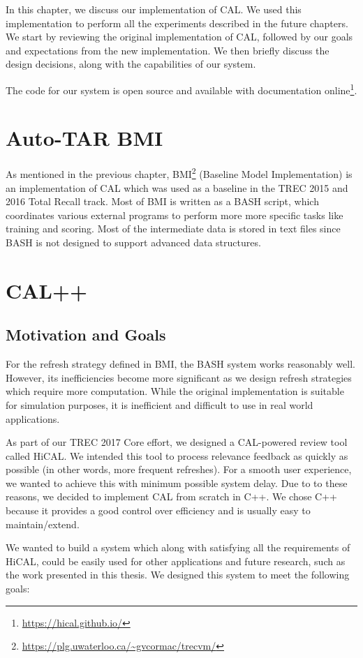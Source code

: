 In this chapter, we discuss our implementation of CAL. We used this
implementation to perform all the experiments described in the future chapters.
We start by reviewing the original implementation of CAL, followed by our goals
and expectations from the new implementation. We then briefly discuss the
design decisions, along with the capabilities of our system.

The code for our system is open source and available with documentation
online\footnote{\url{https://hical.github.io/}}.

\section{Auto-TAR BMI}
As mentioned in the previous chapter,
BMI\footnote{\url{https://plg.uwaterloo.ca/~gvcormac/trecvm/}} (Baseline Model
Implementation) is an implementation of CAL which was used as a baseline in the
TREC 2015 and 2016 Total Recall track. Most of BMI is written as
a BASH script, which coordinates various external programs to perform more
more specific tasks like training and scoring. Most of the intermediate data is
stored in text files since BASH is not designed to support advanced data
structures.

\section{CAL++}

\subsection{Motivation and Goals}
For the refresh strategy defined in BMI, the BASH system works reasonably well.
However, its inefficiencies become more significant as we design refresh
strategies which require more computation. While the original
implementation is suitable for simulation purposes, it is inefficient and
difficult to use in real world applications.

As part of our TREC 2017 Core effort, we designed a CAL-powered review tool
called HiCAL. We intended this tool to process relevance feedback as quickly as
possible (in other words, more frequent refreshes). For a smooth user
experience, we wanted to achieve this with minimum possible system delay. Due to
to these reasons, we decided to implement CAL from scratch in C++. We chose C++
because it provides a good control over efficiency and is usually easy to
maintain/extend.

We wanted to build a system which along with satisfying all the requirements of
HiCAL, could be easily used for other applications and future research, such as
the work presented in this thesis. We designed this system to meet the following
goals:

